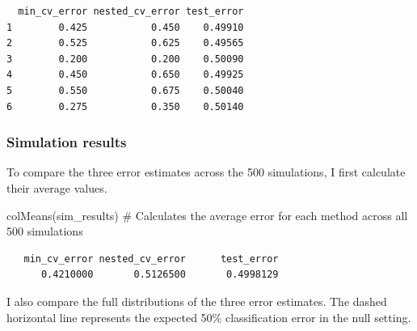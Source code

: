 \documentclass[
  letterpaper,
  DIV=11,
  numbers=noendperiod]{scrreprt}
\newenvironment{Shaded}{\begin{snugshade}}{\end{snugshade}}
\newcommand{\AttributeTok}[1]{\textcolor[rgb]{0.40,0.45,0.13}{#1}}
\newcommand{\CommentTok}[1]{\textcolor[rgb]{0.37,0.37,0.37}{#1}}
\newcommand{\DecValTok}[1]{\textcolor[rgb]{0.68,0.00,0.00}{#1}}
\newcommand{\FloatTok}[1]{\textcolor[rgb]{0.68,0.00,0.00}{#1}}
\newcommand{\FunctionTok}[1]{\textcolor[rgb]{0.28,0.35,0.67}{#1}}
\newcommand{\NormalTok}[1]{\textcolor[rgb]{0.00,0.23,0.31}{#1}}
\newcommand{\SpecialCharTok}[1]{\textcolor[rgb]{0.37,0.37,0.37}{#1}}
\newcommand{\StringTok}[1]{\textcolor[rgb]{0.13,0.47,0.30}{#1}}
\begin{document}
\begin{verbatim}
  min_cv_error nested_cv_error test_error
1        0.425           0.450    0.49910
2        0.525           0.625    0.49565
3        0.200           0.200    0.50090
4        0.450           0.650    0.49925
5        0.550           0.675    0.50040
6        0.275           0.350    0.50140
\end{verbatim}

\subsubsection{Simulation results}\label{simulation-results}

To compare the three error estimates across the 500 simulations, I first
calculate their average values.

\begin{Shaded}
\begin{Highlighting}[]
\FunctionTok{colMeans}\NormalTok{(sim\_results) }\CommentTok{\# Calculates the average error for each method across all 500 simulations}
\end{Highlighting}
\end{Shaded}

\begin{verbatim}
   min_cv_error nested_cv_error      test_error 
      0.4210000       0.5126500       0.4998129 
\end{verbatim}

I also compare the full distributions of the three error estimates. The
dashed horizontal line represents the expected 50\% classification error
in the null setting.

\begin{Shaded}
\end{Shaded}
\end{document}
